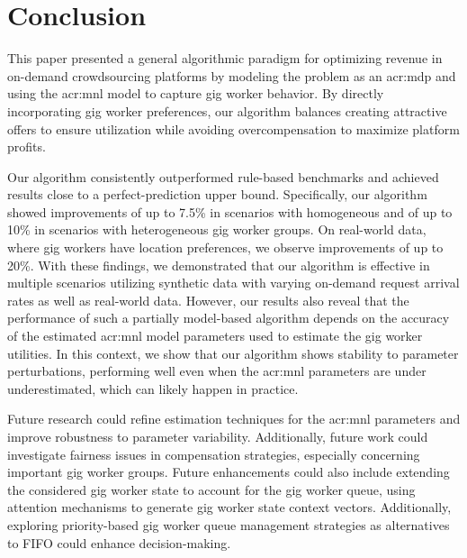 \section{Conclusion}
\label{sec:conc}

This paper presented a general algorithmic paradigm for optimizing revenue in on-demand crowdsourcing platforms by modeling the problem as an \gls{acr:mdp} and using the \gls{acr:mnl} model to capture gig worker behavior. By directly incorporating gig worker preferences, our algorithm balances creating attractive offers to ensure utilization while avoiding overcompensation to maximize platform profits.

Our algorithm consistently outperformed rule-based benchmarks and achieved results close to a perfect-prediction upper bound. Specifically, our algorithm showed improvements of up to 7.5\% in scenarios with homogeneous and of up to 10\% in scenarios with heterogeneous gig worker groups. On real-world data, where gig workers have location preferences, we observe improvements of up to 20\%. With these findings, we demonstrated that our algorithm is effective in multiple scenarios utilizing synthetic data with varying on-demand request arrival rates as well as real-world data. However, our results also reveal that the performance of such a partially model-based algorithm depends on the accuracy of the estimated \gls{acr:mnl} model parameters used to estimate the gig worker utilities. In this context, we show that our algorithm shows stability to parameter perturbations, performing well even when the \gls{acr:mnl} parameters are under underestimated, which can likely happen in practice. 

Future research could refine estimation techniques for the \gls{acr:mnl} parameters and improve robustness to parameter variability. Additionally, future work could investigate fairness issues in compensation strategies, especially concerning important gig worker groups. Future enhancements could also include extending the considered gig worker state to account for the gig worker queue, using attention mechanisms to generate gig worker state context vectors. Additionally, exploring priority-based gig worker queue management strategies as alternatives to FIFO could enhance decision-making.